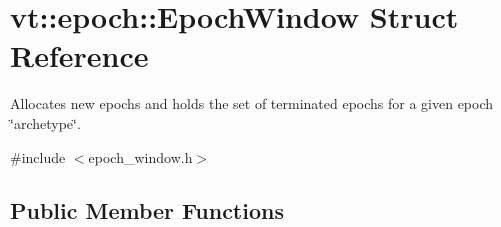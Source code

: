 \hypertarget{structvt_1_1epoch_1_1_epoch_window}{}\section{vt\+:\+:epoch\+:\+:Epoch\+Window Struct Reference}
\label{structvt_1_1epoch_1_1_epoch_window}


Allocates new epochs and holds the set of terminated epochs for a given epoch \char`\"{}archetype\char`\"{}.  




{\ttfamily \#include $<$epoch\+\_\+window.\+h$>$}

\subsection*{Public Member Functions}
